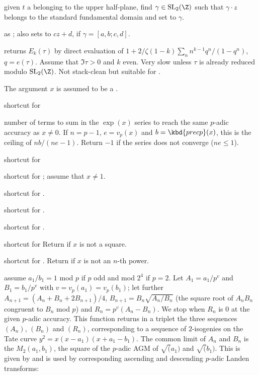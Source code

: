  given $t$ a  belonging to the
upper half-plane, find $\gamma \in \text{SL}_2(\Z)$ such that $\gamma \cdot z$
belongs to the standard fundamental domain and set  to $\gamma$.

 as ; also sets
 to $cz + d$, if $\gamma = [a,b;c,d]$.

 returns $E_k(\tau)$ by direct
evaluation of $1 + 2/\zeta(1-k) \sum_n n^{k-1} q^n/(1-q^n)$, $q = e(\tau)$.
Assume that $\Im \tau > 0$ and $k$ even. Very slow unless $\tau$ is already
reduced modulo $\text{SL}_2(\Z)$. Not stack-clean but suitable for
.


The argument $x$ is assumed to be a .

 shortcut for 

 number of terms to sum in the $\exp(x)$
series to reach the same $p$-adic accuracy as $x\neq 0$. If $n = p-1$, $e =
v_p(x)$ and $b = \kbd{precp}(x)$, this is the ceiling of $nb / (ne - 1)$.
Return $-1$ if the series does not converge ($ne \leq 1$).

 shortcut for 

 shortcut for ;
assume that $x\neq 1$.

 shortcut for
 .

 shortcut for
 .

 shortcut for .

 shortcut for 
Return  if $x$ is not a square.

 shortcut for . Return  if $x$ is not an $n$-th power.

 assume $a_1/b_1 = 1$ mod $p$
if $p$ odd and mod $2^4$ if $p = 2$. Let $A_1 = a_1/p^v$ and $B_1 = b_1/p^v$
with $v = v_p(a_1) = v_p(b_1)$; let further
$A_{n+1} = (A_n + B_n + 2 B_{n+1}) / 4$,
$B_{n+1} = B_n \sqrt{A_n / B_n}$ (the square root of $A_n B_n$ congruent to
$B_n$ mod $p$) and $R_n = p^v(A_n - B_n)$. We stop when $R_n$ is $0$
at the given $p$-adic accuracy. This function returns in a triplet 
the three sequences $(A_n)$, $(B_n)$ and $(R_n)$, corresponding to a sequence
of $2$-isogenies on the Tate curve $y^2 = x(x-a_1)(x+a_1-b_1)$. The
common limit of $A_n$ and $B_n$ is the $M_2(a_1,b_1)$, the square
of the $p$-adic AGM of $\sqrt(a_1)$ and $\sqrt(b_1)$. This is given
by  and is used by corresponding ascending and descending
$p$-adic Landen transforms:

